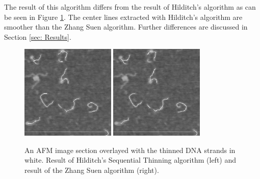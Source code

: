 \documentclass{article}
\begin{document}
The result of this algorithm differs from the result of Hilditch's algorithm as can be seen in Figure \ref{fig: thinnedHilditchZhang}. The center lines extracted with Hilditch's algorithm are smoother than the Zhang Suen algorithm. Further differences are discussed in Section \ref{sec: Results}.
\begin{figure}[htb!]
\centering
\includegraphics[width = 0.4\textwidth]{thinnedHilditch.png}
\includegraphics[width = 0.4\textwidth]{thinnedZhangSuen.png}
\caption{An AFM image section overlayed with the thinned DNA strands in white. Result of Hilditch's Sequential Thinning algorithm (left) and result of the Zhang Suen algorithm (right).}
\label{fig: thinnedHilditchZhang}
\end{figure}
\newpage
\end{document}
